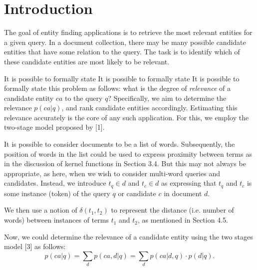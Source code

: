 \documentclass[onepage,a4paper, 12pt]{book}
\begin{document}
	\section{Introduction} %
	\label{sec:introduction}

	The goal of entity finding applications is to retrieve the most relevant entities for a given query. In a document collection, there may be many possible candidate entities that have some relation to the query. The task is to identify which of these candidate entities are most likely to be relevant. 

	It is possible to formally state	It is possible to formally state	It is possible to formally state this problem as follows: what is the degree of \emph{relevance} of a candidate entity $ca$ to the query $q$? Specifically, we aim to determine the relevance $p(ca|q)$, and rank candidate entities accordingly. Estimating this relevance accurately is the core of any such application. For this, we employ the two-stage model proposed by [1].

	It is possible to consider documents to be a list of words. Subsequently, the position of words in the list could be used to  express proximity between terms as in the discussion of kernel functions in Section 3.4. But this may not always be appropriate, as here, when we wish to consider multi-word queries and candidates. Instead, we introduce $t_q \in d$  and $t_c \in d$ as expressing that $t_q$ and $t_c$ is some instance (token) of the query $q$ or candidate $c$ in document $d$.

	We then use a notion of $\delta(t_1, t_2)$ to represent the distance (i.e. number of words) between instances of terms $t_1$ and $t_2$, as mentioned in Section 4.5.

	Now, we could determine the relevance of a candidate entity using the two stages model [3] as follows:
	\begin{equation}
		\label{twoSatges}
		p(ca|q)= \sum_d{p(ca,d|q)}=\sum_d{p(ca|d,q)\cdot p(d|q)}.
	\end{equation} 
\end{document}
